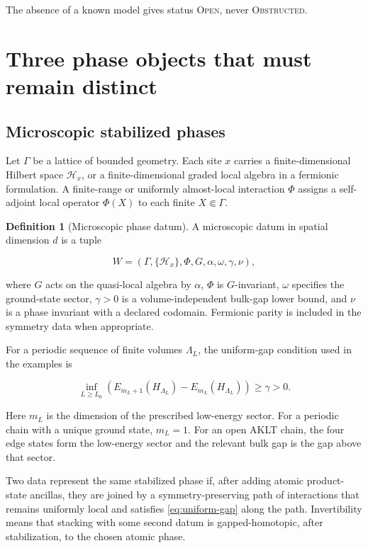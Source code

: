 \documentclass[12pt]{article}
\theoremstyle{definition}
\newtheorem{definition}[theorem]{Definition}
\theoremstyle{remark}
\newcommand{\OPEN}{\textnormal{\textsc{Open}}}
\newcommand{\OBST}{\textnormal{\textsc{Obstructed}}}
\begin{document}
The absence of a known model gives status \OPEN{}, never \OBST{}.

\section{Three phase objects that must remain distinct}

\subsection{Microscopic stabilized phases}

Let $\Gamma$ be a lattice of bounded geometry.  Each site $x$ carries a
finite-dimensional Hilbert space $\mathcal H_x$, or a finite-dimensional
graded local algebra in a fermionic formulation.  A finite-range or
uniformly almost-local interaction $\Phi$ assigns a self-adjoint local
operator $\Phi(X)$ to each finite $X\Subset\Gamma$.

\begin{definition}[Microscopic phase datum]
A microscopic datum in spatial dimension $d$ is a tuple

\begin{equation}
  W=(\Gamma,\{\mathcal H_x\},\Phi,G,\alpha,\omega,\gamma,\nu),
  \label{eq:witness-tuple}
\end{equation}

where $G$ acts on the quasi-local algebra by $\alpha$, $\Phi$ is
$G$-invariant, $\omega$ specifies the ground-state sector, $\gamma>0$ is a
volume-independent bulk-gap lower bound, and $\nu$ is a phase invariant with
a declared codomain.  Fermionic parity is included in the symmetry data when
appropriate.
\end{definition}

For a periodic sequence of finite volumes $\Lambda_L$, the uniform-gap
condition used in the examples is

\begin{equation}
  \inf_{L\ge L_0}
  \left(E_{m_L+1}(H_{\Lambda_L})-E_{m_L}(H_{\Lambda_L})\right)
  \ge \gamma>0.
  \label{eq:uniform-gap}
\end{equation}

Here $m_L$ is the dimension of the prescribed low-energy sector.  For a
periodic chain with a unique ground state, $m_L=1$.  For an open AKLT chain,
the four edge states form the low-energy sector and the relevant bulk gap is
the gap above that sector.

Two data represent the same stabilized phase if, after adding atomic
product-state ancillas, they are joined by a symmetry-preserving path of
interactions that remains uniformly local and satisfies
\cref{eq:uniform-gap} along the path.  Invertibility means that stacking with
some second datum is gapped-homotopic, after stabilization, to the chosen
atomic phase.
\end{document}
